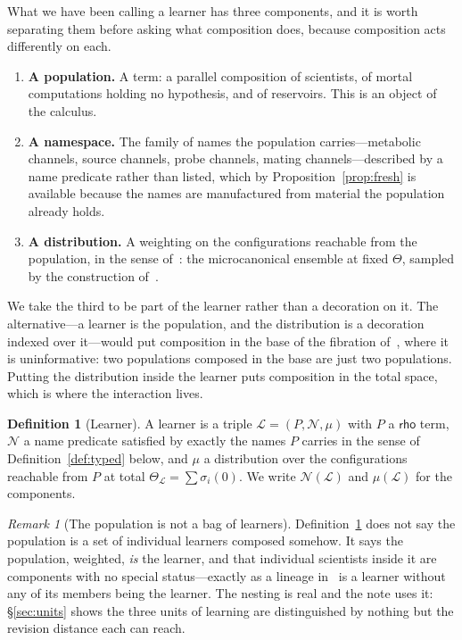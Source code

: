 \documentclass[11pt,a4paper]{article}
\theoremstyle{plain}
\theoremstyle{definition}
\newtheorem{definition}[theorem]{Definition}
\theoremstyle{remark}
\newtheorem{remark}[theorem]{Remark}
\newcommand{\rt}{\mathsf{rho}}
\newcommand{\Lrn}{\mathcal{L}}
\newcommand{\Nsp}{\mathcal{N}}
\begin{document}
What we have been calling a learner has three components, and it is worth separating them before
asking what composition does, because composition acts differently on each.

\begin{enumerate}[label=(\roman*)]
\item \textbf{A population.} A term: a parallel composition of scientists, of mortal
computations holding no hypothesis, and of reservoirs. This is an object of the calculus.
\item \textbf{A namespace.} The family of names the population carries---metabolic channels,
source channels, probe channels, mating channels---described by a name predicate rather than
listed, which by Proposition~\ref{prop:fresh} is available because the names are manufactured
from material the population already holds.
\item \textbf{A distribution.} A weighting on the configurations reachable from the population,
in the sense of~\cite[\S13]{scientist}: the microcanonical ensemble at fixed $\Theta$, sampled by
the construction of~\cite{gillespie-note}.
\end{enumerate}

We take the third to be part of the learner rather than a decoration on it. The alternative---a
learner is the population, and the distribution is a decoration indexed over it---would put
composition in the base of the fibration of~\cite[\S15]{scientist}, where it is uninformative:
two populations composed in the base are just two populations. Putting the distribution inside
the learner puts composition in the total space, which is where the interaction lives.

\begin{definition}[Learner]\label{def:learner}
A learner is a triple $\Lrn = (P, \Nsp, \mu)$ with $P$ a $\rt$ term, $\Nsp$ a name predicate
satisfied by exactly the names $P$ carries in the sense of Definition~\ref{def:typed} below, and
$\mu$ a distribution over the configurations reachable from $P$ at total $\Theta_{\Lrn} =
\sum \sigma_i(0)$. We write $\Nsp(\Lrn)$ and $\mu(\Lrn)$ for the components.
\end{definition}

\begin{remark}[The population is not a bag of learners]
Definition~\ref{def:learner} does not say the population is a set of individual learners composed
somehow. It says the population, weighted, \emph{is} the learner, and that individual scientists
inside it are components with no special status---exactly as a lineage in~\cite[\S12.10]{scientist}
is a learner without any of its members being the learner. The nesting is real and the note uses
it: \S\ref{sec:units} shows the three units of learning are distinguished by nothing but the
revision distance each can reach.
\end{remark}
\end{document}
